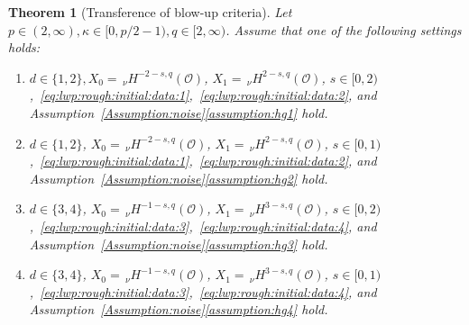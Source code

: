 \documentclass[reqno]{amsart}
\newtheorem{theorem}[Satz]{Theorem}
\newcommand{\sO}{\mathscr{O}}
\newcommand{\1}{\mathbf{1}}
\newcommand{\nH}{\ensuremath{\,_\nu H}}
\newcommand{\bpsn}[1]{\ensuremath{\nH^{#1}(\sO)}}
\begin{document}
	\begin{theorem}[Transference of blow-up criteria]\label{gwp:rough:initial:data}
		Let $p\in (2,\infty),\kappa\in [0,p/2-1),q\in [2,\infty)$. Assume that one of the following settings holds:
		\begin{enumerate}
			\item\label{it:gwp:rough:initial:data:1} $d\in \{1,2\}, X_0=\bpsn{-2-s,q}$, $X_1=\bpsn{2-s,q}$, $s\in [0,2)$,~\eqref{eq:lwp:rough:initial:data:1},~\eqref{eq:lwp:rough:initial:data:2}, and Assumption~\ref{Assumption:noise}\ref{assumption:hg1} hold.
			\item\label{it:gwp:rough:initial:data:2} $d\in \{1,2\}$, $ X_0=\bpsn{-2-s,q}$, $ X_1=\bpsn{2-s,q}$, $ s\in [0,1)$,~\eqref{eq:lwp:rough:initial:data:1},~\eqref{eq:lwp:rough:initial:data:2}, and Assumption~\ref{Assumption:noise}\ref{assumption:hg2} hold.
			\item\label{it:gwp:rough:initial:data:3} $d\in \{3,4\}$, $ X_0=\bpsn{-1-s,q}$, $ X_1=\bpsn{3-s,q}$, $ s\in [0,2)$,~\eqref{eq:lwp:rough:initial:data:3},~\eqref{eq:lwp:rough:initial:data:4}, and Assumption~\ref{Assumption:noise}\ref{assumption:hg3} hold.
            \item\label{it:gwp:rough:intial:data:4} $d\in \{3,4\}$,  $X_0=\bpsn{-1-s,q}$, $ X_1=\bpsn{3-s,q}$, $ s\in [0,1)$,~\eqref{eq:lwp:rough:initial:data:3},~\eqref{eq:lwp:rough:initial:data:4},
            and Assumption~\ref{Assumption:noise}\ref{assumption:hg4} hold. 
		\end{enumerate}
		

\end{theorem}
\end{document}
